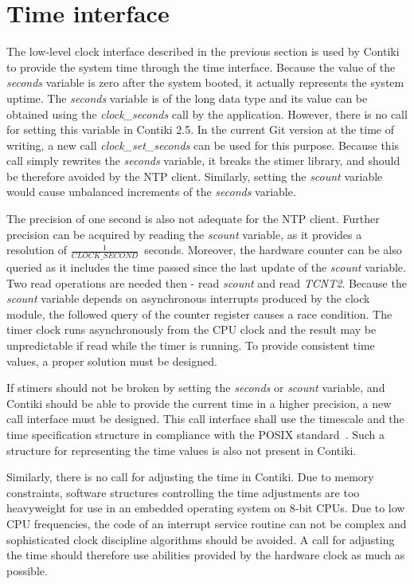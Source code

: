 
\section{Time interface}\label{sec:analysis-time}
The low-level clock interface described in the previous section
is used by Contiki to provide the system time through the time interface.
Because the value of the {\it{seconds}} variable is zero after the system booted,
it actually represents the system uptime.
The {\it{seconds}} variable is of the long data type and its
value can be obtained using the {\it{clock\_seconds}} call by the application.
However, there is no call for setting this variable in Contiki 2.5.
In the current Git version at the time of writing, a new call {\it{clock\_set\_seconds}}
can be used for this purpose.
Because this call simply rewrites the {\it{seconds}} variable, it breaks the stimer library,
and should be therefore avoided by the NTP client.
Similarly, setting the {\it{scount}} variable would cause
unbalanced increments of the {\it{seconds}} variable.

The precision of one second is also not adequate for the NTP client.
Further precision can be acquired by reading the {\it{scount}} variable,
as it provides a resolution of $\frac{1}{CLOCK\_SECOND}$~seconds.
Moreover, the hardware counter can be also queried as it includes the time passed since
the last update of the {\it{scount}} variable.
Two read operations are needed then - read {\it{scount}} and read {\it{TCNT2}}.
Because the {\it{scount}} variable depends on asynchronous interrupts produced by
the clock module, the followed query of the counter register causes a race condition.
The timer clock runs asynchronously from the CPU clock and
the result may be unpredictable if read while the timer is running.
To provide consistent time values, a proper solution must be designed.

If stimers should not be broken by setting the {\it{seconds}} or {\it{scount}} variable,
and Contiki should be able to provide the current time in a higher precision,
a new call interface must be designed.
This call interface shall use the timescale and the time specification structure in compliance %
with the POSIX standard~\cite{posix}.
Such a structure for representing the time values is also not present in Contiki.

Similarly, there is no call for adjusting the time in Contiki.
Due to memory constraints, software structures controlling the time adjustments are too heavyweight
for use in an embedded operating system on 8-bit CPUs.
Due to low CPU frequencies, the code of an interrupt service routine can not be complex
and sophisticated clock discipline algorithms should be avoided.
A call for adjusting the time should therefore use abilities
provided by the hardware clock as much as possible.

